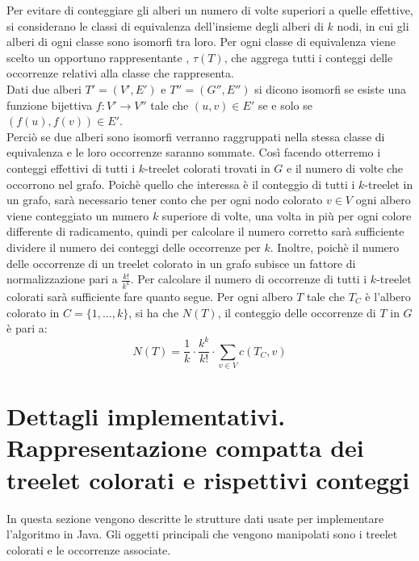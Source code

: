 Per evitare di conteggiare gli alberi un numero di volte superiori a quelle effettive, si considerano le classi di equivalenza dell'insieme degli alberi di $ k $ nodi, in cui gli alberi di ogni classe sono isomorfi tra loro.
Per ogni classe di equivalenza viene scelto un opportuno rappresentante , $ \tau(T) $, che aggrega tutti i conteggi delle occorrenze relativi alla classe che rappresenta. \\
 Dati due alberi $ T' = (V',E')$ e $ T''=(G'',E'') $ si dicono isomorfi se esiste una funzione bijettiva $ f : V' \rightarrow V'' $ tale che $ (u,v)\in E' $ se e solo se $ (f(u),f(v)) \in E' $.\\
Perci\`o se due alberi sono isomorfi verranno raggruppati nella stessa classe di equivalenza e le loro occorrenze saranno sommate.
Cos\`i facendo otterremo i conteggi effettivi di tutti i $ k $-treelet colorati trovati in $ G $ e il numero di volte che occorrono nel grafo.
Poich\`e quello che interessa \`e il conteggio di tutti i $ k $-treelet in un grafo, sar\`a necessario tener conto che per ogni nodo colorato $ v\in V $ ogni albero viene conteggiato un numero $ k $ superiore di volte, una volta in pi\`u per ogni colore differente di radicamento, quindi per calcolare il numero corretto sar\`a sufficiente dividere il numero dei conteggi delle occorrenze per $ k $.
Inoltre, poich\`e il numero delle occorrenze di un treelet colorato in un grafo subisce un fattore di normalizzazione pari a $ \frac{k!}{k^k} $.
Per calcolare il numero di occorrenze di tutti i $ k $-treelet colorati sar\`a sufficiente fare quanto segue.
Per ogni albero $ T $ tale che $ T_C $ \`e l'albero colorato in $ C=\{1,\dots, k\} $, si ha che $ N(T) $, il conteggio delle occorrenze di $ T $ in $ G $ \`e pari a:
\[N(T) = \frac{1}{k} \cdot \frac{k^k}{k!} \cdot \sum_{v\in V} c(T_C,v) \]


\section{Dettagli implementativi. Rappresentazione compatta dei treelet colorati e rispettivi conteggi}
\label{section 2}
In questa sezione vengono descritte le strutture dati usate per implementare l'algoritmo in Java.
Gli oggetti principali che vengono manipolati sono i treelet colorati e le occorrenze associate.

